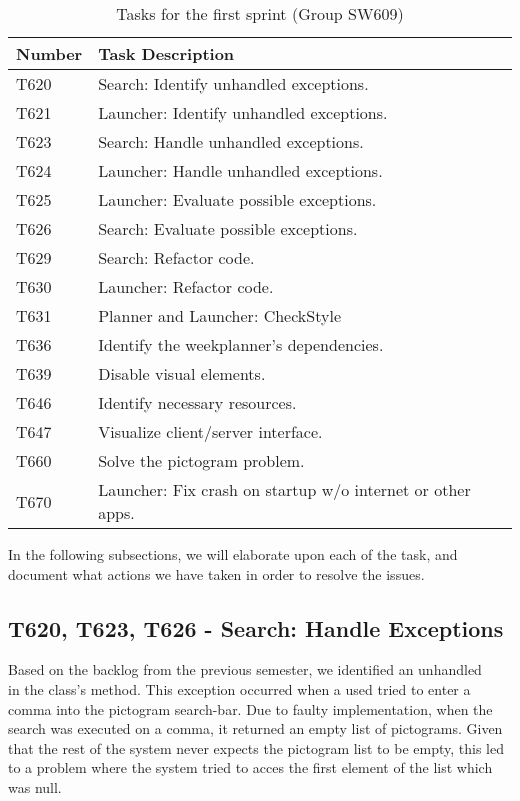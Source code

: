 \begin{table}[H]
\centering
\begin{tabular}{|l|l|}
\hline
Number 			& Task Description 											\\\hline
T620  			& Search: Identify unhandled exceptions.                 	\\\hline
T621    	   	& Launcher: Identify unhandled exceptions. 					\\\hline 
T623	       	& Search: Handle unhandled exceptions.                 		\\\hline
T624    	   	& Launcher: Handle unhandled exceptions.  					\\\hline
T625   	   		& Launcher: Evaluate possible exceptions.        			\\\hline
T626   	   		& Search: Evaluate possible exceptions.                		\\\hline
T629  	   		& Search: Refactor code.			   						\\\hline
T630       		& Launcher: Refactor code.                 					\\\hline
T631       		& Planner and Launcher: CheckStyle                 			\\\hline
T636			& Identify the weekplanner's dependencies.					\\\hline
T639       		& Disable visual elements.                 					\\\hline
T646       		& Identify necessary resources.                 			\\\hline
T647       		& Visualize client/server interface.                 		\\\hline 
T660       		& Solve the pictogram problem.                 				\\\hline
T670       		& Launcher: Fix crash on startup w/o internet or other apps.\\\hline
\end{tabular}
\label{S01:Tasks}  
\caption{Tasks for the first sprint (Group SW609)}
\end{table}

In the following subsections, we will elaborate upon each of the task, and
document what actions we have taken in order to resolve the issues.

\subsection{T620, T623, T626 - Search: Handle Exceptions}
Based on the backlog from the previous semester, we identified an unhandled
\\ in the  class's
 method. This exception occurred when a used tried to enter a
comma into the pictogram search-bar. Due to faulty implementation, when the
search was executed on a comma, it returned an empty list of pictograms. Given
that the rest of the system never expects the pictogram list to be empty, this
led to a problem where the system tried to acces the first element of the list
which was null.\nl

